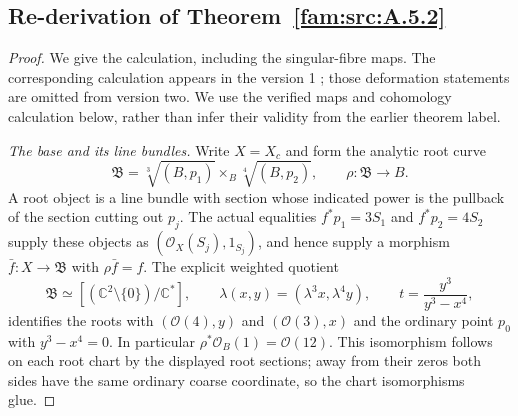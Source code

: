 \subsection{Re-derivation of Theorem~\ref{fam:src:A.5.2}}\label{app:rederive:fam-src-A.5.2}
\begin{proof}
We give the calculation, including the singular-fibre maps. The
corresponding calculation appears in the version 1
\cite[Section 6, especially Proposition 6.10, Lemma 6.11,
Theorem 6.12 and Proposition 6.16]{DuEtAl2026v1}; those deformation
statements are omitted from version two. We use the verified maps and
cohomology calculation below, rather than infer their validity from the
earlier theorem label.

\emph{The base and its line bundles.}
Write $X=X_c$ and form the analytic root curve
\[
 \mathfrak B=\sqrt[3]{(B,p_1)}\mathbin{\times_B}\sqrt[4]{(B,p_2)},
 \qquad \rho:\mathfrak B\longrightarrow B.
\]
A root object is a line bundle with section whose indicated power is the
pullback of the section cutting out $p_j$. The actual equalities
$f^*p_1=3S_1$ and $f^*p_2=4S_2$ supply these objects as
$(\mathcal O_X(S_j),1_{S_j})$, and hence supply a morphism
$\bar f:X\to\mathfrak B$ with $\rho\bar f=f$.
The explicit weighted quotient
\[
 \mathfrak B\simeq[(\mathbb C^2\setminus\{0\})/\mathbb C^*],
 \qquad \lambda(x,y)=(\lambda^3x,\lambda^4y),
 \qquad t=\frac{y^3}{y^3-x^4},
\]
identifies the roots with $(\mathcal O(4),y)$ and
$(\mathcal O(3),x)$ and the ordinary point $p_0$ with
$y^3-x^4=0$. In particular $\rho^*\mathcal O_B(1)=\mathcal O(12)$.
This isomorphism follows on each root chart by the displayed root
sections; away from their zeros both sides have the same ordinary coarse
coordinate, so the chart isomorphisms glue.


\end{proof}
